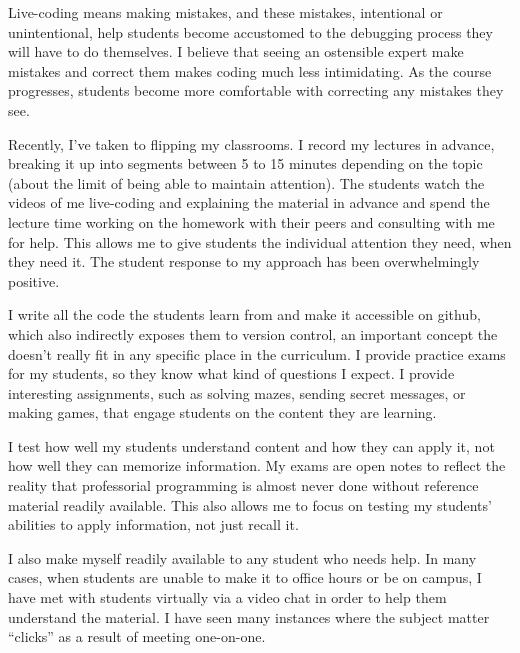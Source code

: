 \documentclass[a4paper]{article}
\begin{document}
Live-coding means making mistakes, and these mistakes, intentional or unintentional, help students become accustomed to the debugging process they will have to do themselves.
I believe that seeing an ostensible expert make mistakes and correct them makes coding much less intimidating.
As the course progresses, students become more comfortable with correcting any mistakes they see.

Recently, I've taken to flipping my classrooms.
I record my lectures in advance, breaking it up into segments between 5 to 15 minutes depending on the topic (about the limit of being able to maintain attention).
The students watch the videos of me live-coding and explaining the material in advance and spend the lecture time working on the homework with their peers and consulting with me for help.
This allows me to give students the individual attention they need, when they need it.
The student response to my approach has been overwhelmingly positive.

I write all the code the students learn from and make it accessible on github, which also indirectly exposes them to version control, an important concept the doesn't really fit in any specific place in the curriculum. 
I provide practice exams for my students, so they know what kind of questions I expect.
I provide interesting assignments, such as solving mazes, sending secret messages, or making games, that engage students on the content they are learning.

I test how well my students understand content and how they can apply it, not how well they can memorize information.
My exams are open notes to reflect the reality that professorial programming is almost never done without reference material readily available.
This also allows me to focus on testing my students' abilities to apply information, not just recall it.

I also make myself readily available to any student who needs help.
In many cases, when students are unable to make it to office hours or be on campus, I have met with students virtually via a video chat in order to help them understand the material.
I have seen many instances where the subject matter ``clicks'' as a result of meeting one-on-one.

%
\end{document}
